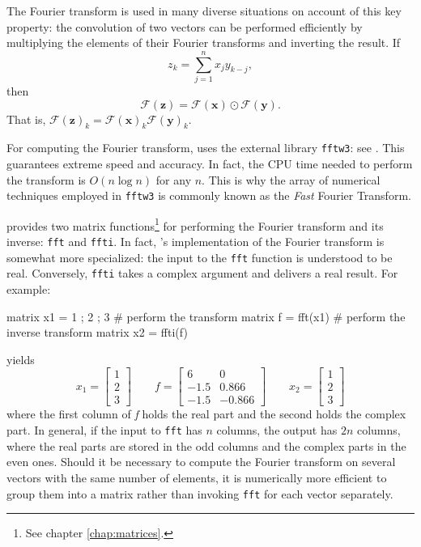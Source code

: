 The Fourier transform is used in many diverse situations
on account of this key property: the convolution of two vectors can be
performed efficiently by multiplying the elements of their Fourier
transforms and inverting the result.  If
\[
  z_k = \sum_{j=1}^n x_j y_{k-j} ,
\]
then
\[
  \mathcal{F}(\mathbf{z}) = \mathcal{F}(\mathbf{x}) \odot
  \mathcal{F}(\mathbf{y}) .
\]
That is, $\mathcal{F}(\mathbf{z})_k = \mathcal{F}(\mathbf{x})_k
\mathcal{F}(\mathbf{y})_k$.

For computing the Fourier transform,  uses the external
library \texttt{fftw3}: see \cite{frigo05}. This guarantees
extreme speed and accuracy. In fact, the CPU time needed to perform
the transform is $O(n \log n)$ for any $n$. This is why the array of
numerical techniques employed in \texttt{fftw3} is commonly known as
the \emph{Fast} Fourier Transform.

 provides two matrix functions\footnote{See chapter
  \ref{chap:matrices}.} for performing the Fourier transform and its
inverse: \texttt{fft} and \texttt{ffti}. In fact, 's
implementation of the Fourier transform is somewhat more specialized:
the input to the \texttt{fft} function is understood to be real.
Conversely, \texttt{ffti} takes a complex argument and delivers a real
result. For example:
\begin{code}
matrix x1 = { 1 ; 2 ; 3 }
# perform the transform
matrix f = fft(x1)
# perform the inverse transform
matrix x2 = ffti(f)
\end{code}
yields
\[
  x_1 = \left[ \begin{array}{c} 1 \\ 2 \\ 3 \end{array} \right] 
  \qquad
  f = \left[ \begin{array}{rr} 
      6 & 0 \\ -1.5 & 0.866 \\ -1.5 & -0.866 
   \end{array} \right] 
  \qquad
  x_2 = \left[ \begin{array}{c} 1 \\ 2 \\ 3 \end{array} \right] 
\]
where the first column of \emph{f} holds the real part and the second
holds the complex part. In general, if the input to \texttt{fft} has
$n$ columns, the output has $2n$ columns, where the real parts are
stored in the odd columns and the complex parts in the even
ones. Should it be necessary to compute the Fourier transform on
several vectors with the same number of elements, it is numerically more
efficient to group them into a matrix rather than invoking
\texttt{fft} for each vector separately.

